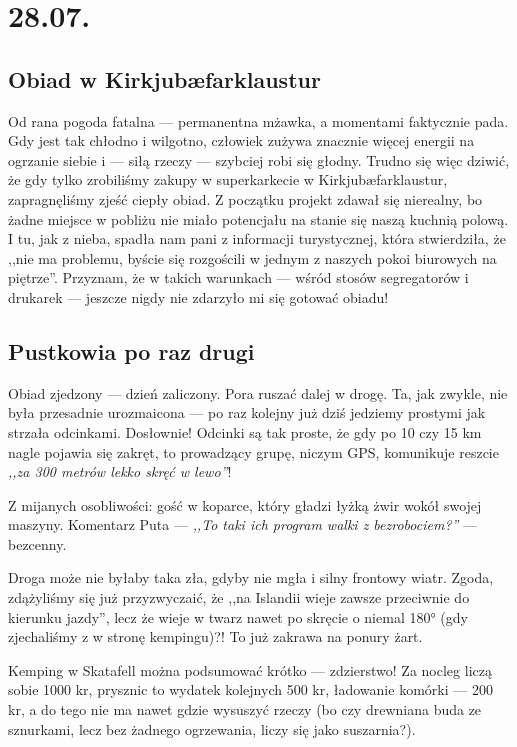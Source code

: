 \chapter*{28.07.}

\section*{Obiad w Kirkjubæfarklaustur}

Od rana pogoda fatalna --- permanentna mżawka, a momentami faktycznie pada. Gdy jest tak chłodno i wilgotno, człowiek zużywa znacznie więcej energii na ogrzanie siebie i --- siłą rzeczy --- szybciej robi się głodny. Trudno się więc dziwić, że gdy tylko zrobiliśmy zakupy w superkarkecie w Kirkjubæfarklaustur, zapragnęliśmy zjeść ciepły obiad. Z początku projekt zdawał się nierealny, bo żadne miejsce w pobliżu nie miało potencjału na stanie się naszą kuchnią polową. I tu, jak z nieba, spadła nam pani z informacji turystycznej, która stwierdziła, że ,,nie ma problemu, byście się rozgościli w jednym z naszych pokoi biurowych na piętrze''. Przyznam, że w takich warunkach --- wśród stosów segregatorów i drukarek --- jeszcze nigdy nie zdarzyło mi się gotować obiadu!


\section*{Pustkowia po raz drugi}

Obiad zjedzony --- dzień zaliczony. Pora ruszać dalej w drogę. Ta, jak zwykle, nie była przesadnie urozmaicona --- po raz kolejny już dziś jedziemy prostymi jak strzała odcinkami. Dosłownie! Odcinki są tak proste, że gdy po 10 czy 15 km nagle pojawia się zakręt, to prowadzący grupę, niczym GPS, komunikuje reszcie \emph{,,za 300 metrów lekko skręć w lewo''}!

Z mijanych osobliwości: gość w koparce, który gładzi łyżką żwir wokół swojej maszyny. Komentarz Puta --- \emph{,,To taki ich program walki z bezrobociem?''} --- bezcenny.


Droga może nie byłaby taka zła, gdyby nie mgła i silny frontowy wiatr. Zgoda, zdążyliśmy się już przyzwyczaić, że ,,na Islandii wieje zawsze przeciwnie do kierunku jazdy'', lecz że wieje w twarz nawet po skręcie o niemal 180° (gdy zjechaliśmy z  w stronę kempingu)?! To już zakrawa na ponury żart.


Kemping w Skatafell można podsumować krótko --- zdzierstwo! Za nocleg liczą sobie 1000 kr, prysznic to wydatek kolejnych 500 kr, ładowanie komórki --- 200 kr, a do tego nie ma nawet gdzie wysuszyć rzeczy (bo czy drewniana buda ze sznurkami, lecz bez żadnego ogrzewania, liczy się jako suszarnia?).
